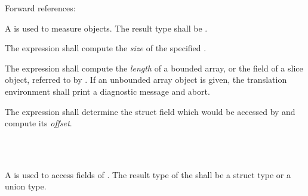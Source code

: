 \begin{grammar}
 \\
	 \\
	 \\
	 \\

 \\
	 \terminal{(}  \terminal{)} \\

 \\
	 \terminal{(}  \terminal{)} \\

 \\
	 \terminal{(}  \terminal{)} \\
\end{grammar}

Forward references: 

\specsubsubitem
A  is used to measure objects. The result
type shall be .

\specsubsubitem
The  expression shall compute the \textit{size} of the specified
.

\specsubsubitem
The  expression shall compute the \textit{length} of a bounded
array, or the  field of a slice object, referred to by
. If an unbounded array object is given, the
translation environment shall print a diagnostic message and abort.

\specsubsubitem
The  expression shall determine the struct field which would be
accessed by  and compute its
\textit{offset}.


\begin{grammar}
 \\
	   \\
\end{grammar}

\specsubsubitem
A  is used to access fields of
. The result type of the
 shall be a struct type or a union type.

